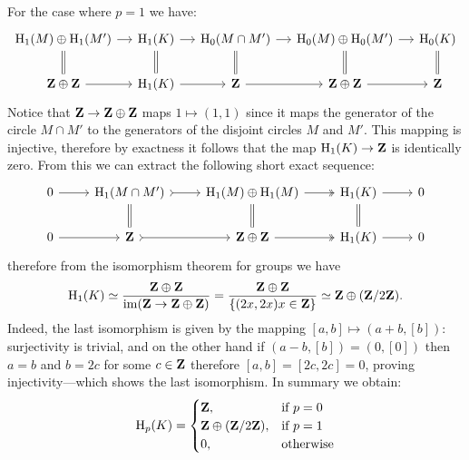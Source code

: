 \begin{example}
    For the case where \(p=1\) we have:
    \[
        \begin{tikzcd}[column sep=small]
            \Hmlg_1(M) \oplus \Hmlg_1(M') \ar[d, equals] \ar[r]
            &\Hmlg_1(K) \ar[d, equals] \ar[r]
            &\Hmlg_0(M \cap M') \ar[d, equals] \ar[r]
            &\Hmlg_0(M) \oplus \Hmlg_0(M') \ar[r] \ar[d, equals]
            &\Hmlg_0(K) \ar[d, equals]
            \\
            \Z \oplus \Z
            \ar[r]
            &\Hmlg_1(K)
            \ar[r]
            &\Z \ar[r]
            &\Z \oplus \Z \ar[r]
            &\Z
        \end{tikzcd}
    \]
    Notice that \(\mathbf{Z} \to \mathbf{Z} \oplus \mathbf{Z}\) maps \(1 \mapsto (1, 1)\) since it maps the generator of
    the circle \(M \cap M'\) to the generators of the disjoint circles \(M\) and
    \(M'\). This mapping is injective, therefore by
    exactness it follows that the map \(\operatorname{H}_1(K) \to \mathbf{Z}\) is identically zero. From
    this we can extract the following short exact sequence:
    \[
        \begin{tikzcd}
            0 \ar[r]
            &\Hmlg_1(M \cap M') \ar[r, tail] \ar[d, equals]
            &\Hmlg_1(M) \oplus \Hmlg_1(M) \ar[r, two heads] \ar[d, equals]
            &\Hmlg_1(K) \ar[r] \ar[d, equals]
            &0
            \\
            0 \ar[r]
            &\Z \ar[r, tail]
            &\Z \oplus \Z \ar[r, two heads]
            &\Hmlg_1(K) \ar[r]
            &0
        \end{tikzcd}
    \]
    therefore from the isomorphism theorem for groups we have
    \[
        \operatorname{H}_1(K)
        \simeq \frac{\mathbf{Z} \oplus \mathbf{Z}}{\operatorname{im}(\mathbf{Z} \to \mathbf{Z} \oplus \mathbf{Z})}
        = \frac{\mathbf{Z} \oplus \mathbf{Z}}{\{(2x, 2x) \relax x \in \mathbf{Z}\}}
        \simeq \mathbf{Z} \oplus (\mathbf{Z}/2\mathbf{Z}).
    \]
    Indeed, the last isomorphism is given by the mapping
    \([a, b] \mapsto (a + b, [b])\): surjectivity is trivial, and on the other hand if
    \((a - b, [b]) = (0, [0])\) then \(a = b\) and \(b = 2c\) for some \(c \in \mathbf{Z}\)
    therefore \([a, b] = [2c, 2c] = 0\), proving injectivity---which shows the last
    isomorphism. In summary we obtain:
    \[
        \operatorname{H}_p(K) =
        \begin{cases}
            \mathbf{Z},                 & \text{if } p = 0 \\
            \mathbf{Z} \oplus (\mathbf{Z}/2\mathbf{Z}), & \text{if } p = 1 \\
            0,                  & \text{otherwise}
        \end{cases}
    \]
\end{example}


